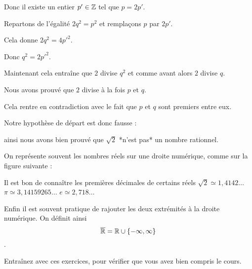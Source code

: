 \change

Donc il existe un entier $p'\in \mathbb{Z}$ tel que $p=2p'$. 

\change

Repartons de l'égalité $2q^2=p^2$ et remplaçons $p$ par $2p'$. 

\change

Cela donne
$2q^2=4p'^2$. 

\change

Donc $q^2=2p'^2$. 

\change

Maintenant cela entraîne que $2$ divise $q^2$
et comme avant alors $2$ divise $q$.

\change

Nous avons prouvé que $2$ divise à la fois $p$ et $q$. 

\change

Cela rentre en contradiction avec le fait que $p$ et $q$ sont premiers
entre eux. 

\change

Notre hypothèse de départ est donc fausse :

\change

ainsi nous avons bien prouvé que $\sqrt2$ *n'est pas* un nombre rationnel.


\diapo

On représente souvent les nombres réels sur une \og{}droite numérique\fg{}, comme sur la figure suivante :

\change

Il est bon de connaître les premières décimales de certains réels 
$\sqrt{2}\simeq 1,4142\ldots$ \quad 
$\pi\simeq 3,14159265\ldots$ \quad $e\simeq 2,718\ldots$

\change

Enfin il est souvent pratique de rajouter les deux extrémités à la droite numérique.
On définit ainsi \[ \overline{\mathbb{R}}=\mathbb{R}\cup\{-\infty,\infty\}  \].





\diapo

Entraînez avec ces exercices, 
pour vérifier que vous avez bien compris le cours.


